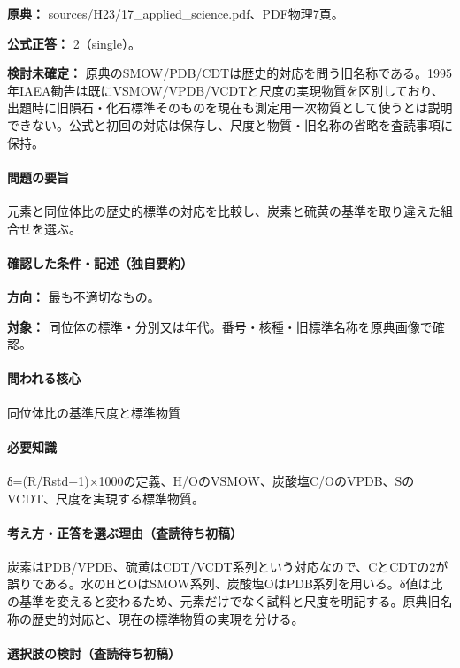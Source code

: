 \noindent\textbf{原典：} sources/H23/17\_applied\_science.pdf、PDF物理7頁。

\textbf{公式正答：} 2（single）。

\par\textbf{検討未確定：} 原典のSMOW/PDB/CDTは歴史的対応を問う旧名称である。1995年IAEA勧告は既にVSMOW/VPDB/VCDTと尺度の実現物質を区別しており、出題時に旧隕石・化石標準そのものを現在も測定用一次物質として使うとは説明できない。公式と初回の対応は保存し、尺度と物質・旧名称の省略を査読事項に保持。

\paragraph{問題の要旨} 元素と同位体比の歴史的標準の対応を比較し、炭素と硫黄の基準を取り違えた組合せを選ぶ。

\paragraph{確認した条件・記述（独自要約）}\mbox{}\par

\noindent\textbf{方向：} 最も不適切なもの。\par

\noindent\textbf{対象：} 同位体の標準・分別又は年代。番号・核種・旧標準名称を原典画像で確認。\par

\paragraph{問われる核心} 同位体比の基準尺度と標準物質

\paragraph{必要知識} δ=(R/Rstd−1)×1000の定義、H/OのVSMOW、炭酸塩C/OのVPDB、SのVCDT、尺度を実現する標準物質。

\paragraph{考え方・正答を選ぶ理由（査読待ち初稿）} 炭素はPDB/VPDB、硫黄はCDT/VCDT系列という対応なので、CとCDTの2が誤りである。水のHとOはSMOW系列、炭酸塩OはPDB系列を用いる。δ値は比の基準を変えると変わるため、元素だけでなく試料と尺度を明記する。原典旧名称の歴史的対応と、現在の標準物質の実現を分ける。

\paragraph{選択肢の検討（査読待ち初稿）}\mbox{}\par

